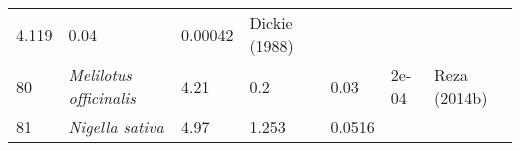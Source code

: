 \documentclass[]{article}
\begin{document}
\begin{longtable}[]{@{}lllllll@{}}
\begin{minipage}[t]{0.08\columnwidth}
4.119\strut
\end{minipage} & \begin{minipage}[t]{0.08\columnwidth}\raggedright
0.04\strut
\end{minipage} & \begin{minipage}[t]{0.08\columnwidth}\raggedright
0.00042\strut
\end{minipage} & \begin{minipage}[t]{0.23\columnwidth}\raggedright
Dickie (1988)\strut
\end{minipage}\tabularnewline
\begin{minipage}[t]{0.05\columnwidth}\raggedright
80\strut
\end{minipage} & \begin{minipage}[t]{0.23\columnwidth}\raggedright
\emph{Melilotus officinalis}\strut
\end{minipage} & \begin{minipage}[t]{0.05\columnwidth}\raggedright
4.21\strut
\end{minipage} & \begin{minipage}[t]{0.08\columnwidth}\raggedright
0.2\strut
\end{minipage} & \begin{minipage}[t]{0.08\columnwidth}\raggedright
0.03\strut
\end{minipage} & \begin{minipage}[t]{0.08\columnwidth}\raggedright
2e-04\strut
\end{minipage} & \begin{minipage}[t]{0.23\columnwidth}\raggedright
Reza (2014b)\strut
\end{minipage}\tabularnewline
\begin{minipage}[t]{0.05\columnwidth}\raggedright
81\strut
\end{minipage} & \begin{minipage}[t]{0.23\columnwidth}\raggedright
\emph{Nigella sativa}\strut
\end{minipage} & \begin{minipage}[t]{0.05\columnwidth}\raggedright
4.97\strut
\end{minipage} & \begin{minipage}[t]{0.08\columnwidth}\raggedright
1.253\strut
\end{minipage} & \begin{minipage}[t]{0.08\columnwidth}\raggedright
0.0516\strut
\end{minipage} & \begin{minipage}[t]{0.08\columnwidth}\raggedright

\end{minipage}
\end{longtable}
\end{document}
